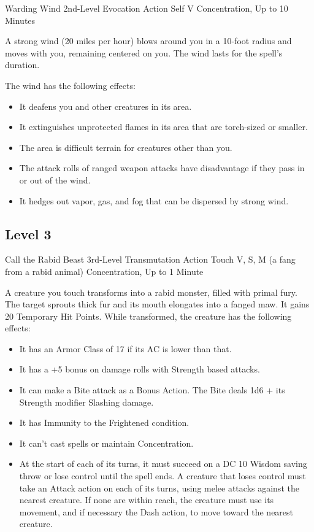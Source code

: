 \documentclass[letterpaper,openany,oneside,twocolumn]{book}
\begin{document}
\DndSpellHeader
  {Warding Wind}
  {2nd-Level Evocation}
  {Action}
  {Self}
  {V}
  {Concentration, Up to 10 Minutes}

A strong wind (20 miles per hour) blows around you in a 10-foot radius and moves with you, remaining centered on you. The wind lasts for the spell's duration.

The wind has the following effects:
\begin{itemize}
	\item It deafens you and other creatures in its area.
	\item It extinguishes unprotected flames in its area that are torch-sized or smaller.
	\item The area is difficult terrain for creatures other than you.
	\item The attack rolls of ranged weapon attacks have disadvantage if they pass in or out of the wind.
	\item It hedges out vapor, gas, and fog that can be dispersed by strong wind.
\end{itemize}

\subsection*{Level 3}

\DndSpellHeader
  {Call the Rabid Beast}
  {3rd-Level Transmutation}
  {Action}
  {Touch}
  {V, S, M (a fang from a rabid animal)}
  {Concentration, Up to 1 Minute}

A creature you touch transforms into a rabid monster, filled with primal fury. The target sprouts thick fur and its mouth elongates into a fanged maw. It gains 20 Temporary Hit Points. While transformed, the creature has the following effects:

\begin{itemize}
	\item It has an Armor Class of 17 if its AC is lower than that.
	\item It has a +5 bonus on damage rolls with Strength based attacks.
	\item It can make a Bite attack as a Bonus Action. The Bite deals 1d6 + its Strength modifier Slashing damage.
	\item It has Immunity to the Frightened condition.
	\item It can't cast spells or maintain Concentration.
	\item At the start of each of its turns, it must succeed on a DC 10 Wisdom saving throw or lose control until the spell ends. A creature that loses control must take an Attack action on each of its turns, using melee attacks against the nearest creature. If none are within reach, the creature must use its movement, and if necessary the Dash action, to move toward the nearest creature.
\end{itemize}
\end{document}
